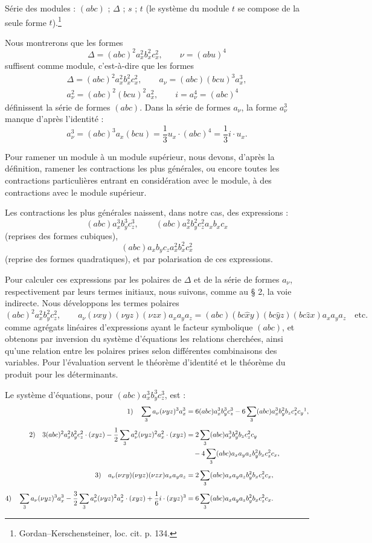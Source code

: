 \documentclass[11pt]{article}
\newcommand{\A}{\Delta}
\begin{document}
Série des modules : $(abc)$ ; $\A$ ; $s$ ; $t$ (le système du module $t$ se compose de la seule forme $t$).\footnote{Gordan--Kerschensteiner, loc. cit. p. 134.}

Nous montrerons que les formes
\[
\A=(abc)^2a_x^2b_x^2c_x^2,\qquad \nu=(abu)^4
\]
suffisent comme module, c'est-à-dire que les formes
\[
\begin{gathered}
\A=(abc)^2a_x^2b_x^2c_x^2,\qquad
a_\nu=(abc)(bcu)^3a_x^3,\\
a_\nu^2=(abc)^2(bcu)^2a_x^2,\qquad
i=a_\nu^4=(abc)^4
\end{gathered}
\]
définissent la série de formes $(abc)$. Dans la série de formes $a_\nu$, la forme $a_\nu^3$ manque d'après l'identité :
\[
a_\nu^3=(abc)^3a_x(bcu)=\frac13 u_x\cdot(abc)^4=\frac13 i\cdot u_x.
\]

Pour ramener un module à un module supérieur, nous devons, d'après la définition, ramener les contractions les plus générales, ou encore toutes les contractions particulières entrant en considération avec le module, à des contractions avec le module supérieur.

Les contractions les plus générales naissent, dans notre cas, des expressions :
\[
(abc)a_x^3b_y^3c_z^3,\qquad
(abc)a_x^2b_y^2c_z^2a_xb_xc_x
\]
(reprises des formes cubiques),
\[
(abc)a_xb_yc_za_x^2b_x^2c_x^2
\]
(reprise des formes quadratiques), et par polarisation de ces expressions.

Pour calculer ces expressions par les polaires de $\A$ et de la série de formes $a_\nu$, respectivement par leurs termes initiaux, nous suivons, comme au \S{} 2, la voie indirecte. Nous développons les termes polaires
\[
(abc)^2a_x^2b_y^2c_z^2,\qquad
a_\nu(\nu xy)(\nu yz)(\nu zx)a_xa_ya_z
=(abc)(bc\widehat{x}y)(bc\widehat{y}z)(bc\widehat{z}x)a_xa_ya_z\quad\text{etc.}
\]
comme agrégats linéaires d'expressions ayant le facteur symbolique $(abc)$, et obtenons par inversion du système d'équations les relations cherchées, ainsi qu'une relation entre les polaires prises selon différentes combinaisons des variables. Pour l'évaluation servent le théorème d'identité et le théorème du produit pour les déterminants.

Le système d'équations, pour $(abc)a_x^3b_y^3c_z^3$, est :
\begingroup\small
\[
\begin{aligned}
1)\quad
\sum_3 a_\nu(\nu yz)^3a_x^3
&=6(abc)a_x^3b_y^3c_z^3
-6\sum_3(abc)a_x^3b_y^2b_zc_z^2c_y\footnotemark,\\[0.4em]
2)\quad
3(abc)^2a_x^2b_y^2c_z^2\cdot(xyz)
-\frac12\sum_3a_\nu^2(\nu yz)^2a_x^2\cdot(xyz)
&=2\sum_3(abc)a_x^3b_y^2b_zc_z^2c_y\\
&\quad-4\sum_3(abc)a_xa_ya_zb_y^2b_xc_z^2c_x,\\[0.4em]
3)\quad
a_\nu(\nu xy)(\nu yz)(\nu zx)a_xa_ya_z
&=2\sum_3(abc)a_xa_ya_zb_y^2b_xc_z^2c_x,\\[0.4em]
4)\quad
\sum_3a_\nu(\nu yz)^3a_x^3
-\frac32\sum_3a_\nu^2(\nu yz)^2a_x^2\cdot(xyz)
+\frac16 i\cdot(xyz)^3
&=6\sum_3(abc)a_xa_ya_zb_y^2b_xc_z^2c_x.
\end{aligned}
\]
\endgroup
{}
\end{document}
